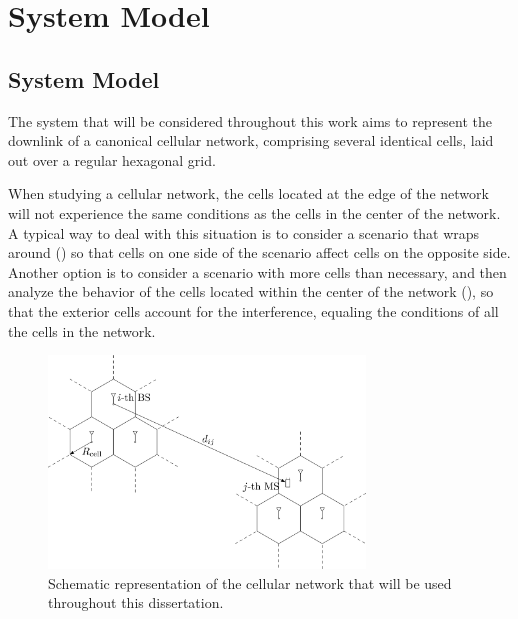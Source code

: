 \chapter{System Model}\label{ch:system_model}

\section{System Model}\label{sec:system_model}
The system that will be considered throughout this work aims to represent the
downlink of a canonical cellular network, comprising several identical cells,
laid out over a regular hexagonal grid.

When studying a cellular network, the cells located at the edge of the network
will not experience the same conditions as the cells in the center of the
network. A typical way to deal with this situation is to consider a scenario
that wraps around () so that cells on one side of the
scenario affect cells on the opposite side. Another option is to consider a
scenario with more cells than necessary, and then analyze the behavior of the
cells located within the center of the network
(), so that the exterior cells account for the
interference, equaling the conditions of all the cells in the network.

\begin{figure}[t]
   \centering
   \includegraphics[width=0.75\textwidth]{./03.system_model/img/cellular_layout}
   \caption{Schematic representation of the cellular network that will be used
       throughout this dissertation.}
   \label{fig:gen_cellular_layout}
\end{figure}

